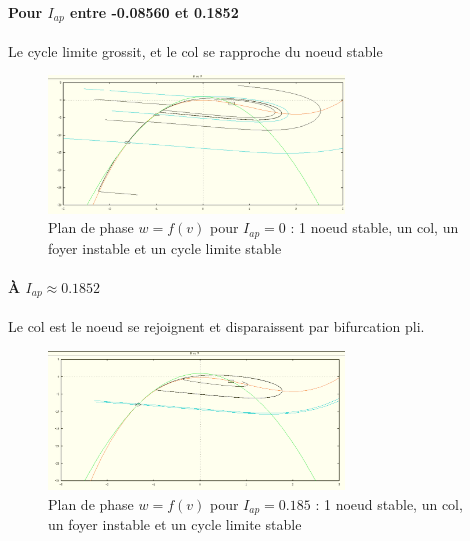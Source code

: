 \documentclass[12pt,a4paper,onecolumn]{article}
\begin{document}
\paragraph{Pour $I_{ap}$ entre -0.08560 et 0.1852}
Le cycle limite grossit, et le col se rapproche du noeud stable
\begin{figure}[H]
	\begin{center}
	\includegraphics[width = 0.7\textwidth]{I0.png}
	\end{center}
\caption{Plan de phase $w=f(v)$ pour $I_{ap} = 0$ : 1 noeud stable, un col, un foyer instable et un cycle limite stable}
\end{figure}

\paragraph{À $I_{ap} \approx 0.1852$}
Le col est le noeud se rejoignent et disparaissent par bifurcation pli.
\begin{figure}[H]
	\begin{center}
	\includegraphics[width = 0.7\textwidth]{I0_185.png}
	\end{center}
\caption{Plan de phase $w=f(v)$ pour $I_{ap} = 0.185$ : 1 noeud stable, un col, un foyer instable et un cycle limite stable}
\end{figure}
\end{document}
